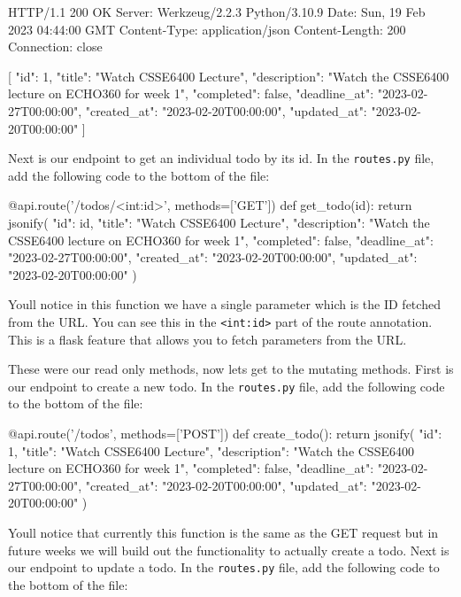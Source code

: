 \documentclass{csse4400}
\begin{document}
\begin{code}[language=json,numbers=none]{}
  HTTP/1.1 200 OK
  Server: Werkzeug/2.2.3 Python/3.10.9
  Date: Sun, 19 Feb 2023 04:44:00 GMT
  Content-Type: application/json
  Content-Length: 200
  Connection: close
  
  [
    {
      "id": 1,
      "title": "Watch CSSE6400 Lecture",
      "description": "Watch the CSSE6400 lecture on ECHO360 for week 1",
      "completed": false,
      "deadline_at": "2023-02-27T00:00:00",
      "created_at": "2023-02-20T00:00:00",
      "updated_at": "2023-02-20T00:00:00"
    }
  ]
\end{code}

Next is our endpoint to get an individual todo by its id. In the \texttt{routes.py} file, add the following code to the bottom of the file:

\begin{code}[language=python]{}
  @api.route('/todos/<int:id>', methods=['GET'])
  def get_todo(id):
      return jsonify({
        "id": id,
        "title": "Watch CSSE6400 Lecture",
        "description": "Watch the CSSE6400 lecture on ECHO360 for week 1",
        "completed": false,
        "deadline_at": "2023-02-27T00:00:00",
        "created_at": "2023-02-20T00:00:00",
        "updated_at": "2023-02-20T00:00:00"
      })
\end{code}

Youll notice in this function we have a single parameter which is the ID fetched from the URL. You can see this in the \texttt{<int:id>} part of the route annotation. This is a flask feature that allows you to fetch parameters from the URL. 

These were our read only methods, now lets get to the mutating methods. First is our endpoint to create a new todo. In the \texttt{routes.py} file, add the following code to the bottom of the file:

\begin{code}[language=python]{}
  @api.route('/todos', methods=['POST'])
  def create_todo():
      return jsonify({
        "id": 1,
        "title": "Watch CSSE6400 Lecture",
        "description": "Watch the CSSE6400 lecture on ECHO360 for week 1",
        "completed": false,
        "deadline_at": "2023-02-27T00:00:00",
        "created_at": "2023-02-20T00:00:00",
        "updated_at": "2023-02-20T00:00:00"
      })
\end{code}

Youll notice that currently this function is the same as the GET request but in future weeks we will build out the functionality to actually create a todo. Next is our endpoint to update a todo. In the \texttt{routes.py} file, add the following code to the bottom of the file:
\end{document}
